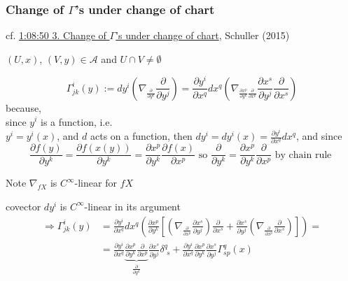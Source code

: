	\subsubsection{Change of $\Gamma$'s under change of chart}

cf. \href{https://youtu.be/nEaiZBbCVtI?t=4130}{1:08:50 3. Change of $\Gamma$'s under change of chart}, Schuller (2015) \cite{dgdt:Schul2015}

$(U,x)$, $(V,y) \in \mathcal{A}$ and $U \cap V \neq \emptyset$

\[
\Gamma^i_{jk}(y) := dy^i \left( \nabla_{ \frac{ \partial}{ \partial y^k} } \frac{ \partial }{ \partial y^j} \right) = \frac{ \partial y^i}{ \partial x^q }dx^q \left( \nabla_{\frac{ \partial x^p}{ \partial y^k}  \frac{ \partial }{ \partial x^p} } \frac{ \partial x^s}{ \partial y^j} \frac{ \partial }{ \partial x^s } \right)
\]
because, \\
since $y^i$ is a function, i.e. \\
$y^i = y^i(x)$, and $d$ acts on a function, then $dy^i = dy^i(x) = \frac{ \partial y^i}{\partial x^q} dx^q$, and since
\[
\frac{\partial f(y) }{ \partial y^k} = \frac{\partial f(x(y)) }{ \partial y^k} = \frac{ \partial x^p }{ \partial y^k} \frac{ \partial f(x) }{ \partial x^p} \text{ so } \frac{ \partial }{ \partial y^k} = \frac{\partial x^p}{ \partial y^k} \frac{\partial}{ \partial x^p} \text{ by chain rule }
\]

Note $\nabla_{fX}$ is $C^{\infty}$-linear for $fX$

covector $dy^i$ is $C^{\infty}$-linear in its argument
\[
\begin{aligned}
	\Longrightarrow \Gamma_{jk}^i(y) & = \frac{ \partial y^i}{ \partial x^q} dx^q \left( \frac{ \partial x^p}{ \partial y^k} \left[ \left( \nabla_{ \frac{ \partial }{ \partial x^p} } \frac{ \partial x^s}{ \partial y^j} \right) \frac{ \partial }{ \partial x^s} + \frac{ \partial x^s}{ \partial y^j} \left( \nabla_{ \frac{ \partial }{ \partial x^p } } \frac{ \partial }{ \partial x^s } \right)  \right] \right) = \\
	& = \frac{ \partial y^i}{ \partial x^q} \underbrace{\frac{ \partial x^p }{ \partial y^k} \frac{ \partial }{ \partial x^p }}_{\frac{\partial}{\partial y^k} } \frac{ \partial x^s}{ \partial y^j } \delta^q_{ \, \, s} + \frac{ \partial y^i}{ \partial x^q} \frac{ \partial x^p }{ \partial y^k} \frac{ \partial x^s}{ \partial y^j} \Gamma^q_{sp}(x)
\end{aligned}
\]


